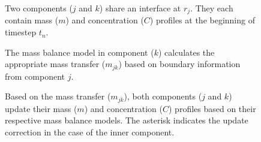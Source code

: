 

\begin{figure}[htbp!]
  \begin{center}
    \def\svgwidth{.4\textwidth}
    
  \end{center}
        \caption{Two components ($j$ and $k$) share an interface at $r_j$. They 
        each contain mass ($m$) and concentration ($C$) profiles at the 
        beginning of timestep $t_n$.}
  \label{fig:vols}
\end{figure}

\begin{figure}[htbp!]
  \begin{center}
    \def\svgwidth{.4\textwidth}
    
  \end{center}
        \caption{The mass balance model in component ($k$) calculates the appropriate
        mass transfer ($m_{jk}$) based on boundary information from component 
        $j$.}
  \label{fig:vols_trans}
\end{figure}

\begin{figure}[htbp!]
  \begin{center}
    \def\svgwidth{.4\textwidth}
    
  \end{center}
        \caption{Based on the mass transfer ($m_{jk}$), both components ($j$ 
        and $k$) update their mass ($m$) and concentration ($C$) profiles based 
        on their respective mass balance models. The asterisk indicates the 
        update correction in the case of the inner component.}
  \label{fig:vols_update}
\end{figure}

